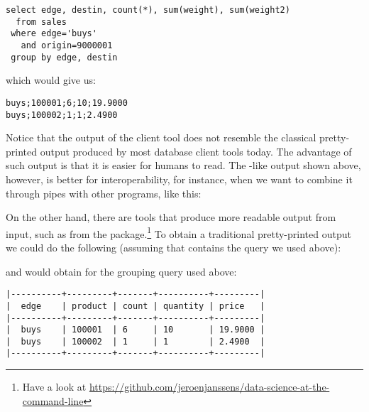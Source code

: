 \begin{sqlcode}
\begin{lstlisting}
select edge, destin, count(*), sum(weight), sum(weight2)
  from sales 
 where edge='buys' 
   and origin=9000001 
 group by edge, destin
\end{lstlisting}
\end{sqlcode}

\begin{minipage}{\textwidth}
which would give us:
\begin{verbatim}
buys;100001;6;10;19.9000
buys;100002;1;1;2.4900
\end{verbatim}
\end{minipage}

Notice that the output
of the client tool does not resemble the classical
pretty-printed output produced by most database
client tools today. The advantage of such output is
that it is easier for humans to read.
The -like output shown above, however,
is better for interoperability, for instance,
when we want to combine it through pipes
with other programs, like this:


On the other hand, there are tools that
produce more readable output from  input,
such as  from the  package.\footnote{Have
a look at
\url{https://github.com/jeroenjanssens/data-science-at-the-command-line}}
To obtain a traditional pretty-printed output we could do the following
(assuming that  contains the query we used above):


and would obtain for the grouping query used above:

\begin{minipage}{\textwidth}
\begin{verbatim}
|----------+---------+-------+----------+---------|
|  edge    | product | count | quantity | price   |
|----------+---------+-------+----------+---------|
|  buys    | 100001  | 6     | 10       | 19.9000 |
|  buys    | 100002  | 1     | 1        | 2.4900  |
|----------+---------+-------+----------+---------|
\end{verbatim}
\end{minipage}

